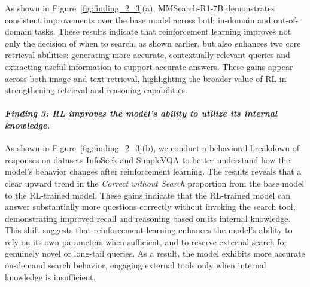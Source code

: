 \documentclass{article}
\begin{document}
As shown in Figure~\ref{fig:finding_2_3}(a), MMSearch-R1-7B demonstrates consistent improvements over the base model across both in-domain and out-of-domain tasks. These results indicate that reinforcement learning improves not only the decision of when to search, as shown earlier, but also enhances two core retrieval abilities: generating more accurate, contextually relevant queries and extracting useful information to support accurate answers. These gains appear across both image and text retrieval, highlighting the broader value of RL in strengthening retrieval and reasoning capabilities.

\paragraph{\textit{Finding 3: RL improves the model's ability to utilize its internal knowledge.}} As shown in Figure~\ref{fig:finding_2_3}(b), we conduct a behavioral breakdown of responses on datasets InfoSeek and SimpleVQA to better understand how the model’s behavior changes after reinforcement learning. The results reveals that a clear upward trend in the \textit{Correct without Search} proportion from the base model to the RL-trained model. These gains indicate that the RL-trained model can answer substantially more questions correctly without invoking the search tool, demonstrating improved recall and reasoning based on its internal knowledge. This shift suggests that reinforcement learning enhances the model's ability to rely on its own parameters when sufficient, and to reserve external search for genuinely novel or long-tail queries. As a result, the model exhibits more accurate on-demand search behavior, engaging external tools only when internal knowledge is insufficient.
\end{document}
